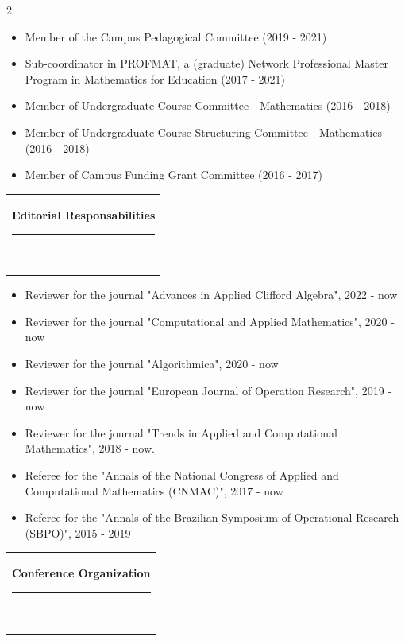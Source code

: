 \documentclass[10pt,A4,english]{article}
\newcommand{\mpwidth}{\linewidth-\fboxsep-\fboxsep}
\newcommand{\cvtext}[1] {
	\begin{tabular*}{1\mpwidth}{p{1.05\mpwidth}}
		\parbox{1\mpwidth}{#1}
	\end{tabular*}
}
\newcommand{\cvsection}[1] {
	\vspace{14pt}
	\cvtext{
		\textbf{\LARGE{\textcolor{darkcol}{#1}}}\\[-4pt]
		\textcolor{accentcol}{ \rule{0.2\textwidth}{1.5pt} } \\
	}
}
\begin{document}
\begin{paracol}{2}
\begin{rightcolumn}
\begin{itemize}[leftmargin=*]
\item Member of the Campus Pedagogical Committee (2019 - 2021)

\item Sub-coordinator in PROFMAT, a (graduate) Network Professional Master Program in Mathematics for Education (2017 - 2021)

\item Member of Undergraduate Course Committee - Mathematics (2016 - 2018)

\item Member of Undergraduate Course Structuring Committee - Mathematics (2016 - 2018)

\item Member of Campus Funding Grant Committee (2016 - 2017)

\end{itemize}



\cvsection{Editorial Responsabilities}

\begin{itemize}[leftmargin=*]

\item Reviewer for the journal "Advances in Applied Clifford Algebra", 2022 - now

\item Reviewer for the journal "Computational and Applied Mathematics", 2020 - now

\item Reviewer for the journal "Algorithmica", 2020 - now

\item Reviewer for the journal "European Journal of Operation Research", 2019 - now

\item Reviewer for the journal "Trends in Applied and Computational Mathematics", 2018 - now.

\item Referee for the "Annals of the National Congress of Applied and Computational Mathematics (CNMAC)", 2017 - now

\item Referee for the "Annals of the Brazilian Symposium of Operational Research (SBPO)", 2015 - 2019

\end{itemize}

\bigskip 

\cvsection{Conference Organization}

\begin{itemize}[leftmargin=*]


\end{itemize}
\end{rightcolumn}
\end{paracol}
\end{document}
